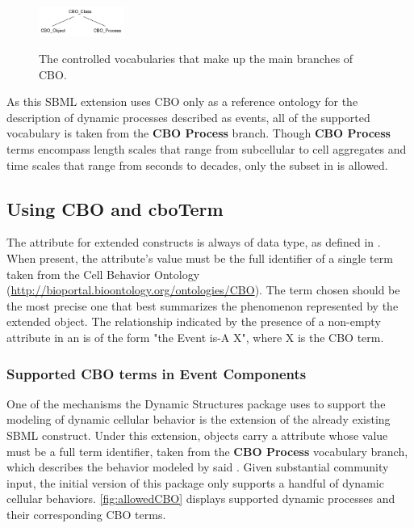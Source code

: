 \begin{figure}[tbhp]
	\centering
	\includegraphics[width=0.25\textwidth]{images/CBO_Hierarchy.pdf}\\
	\caption{The controlled vocabularies that make up the main branches of CBO.} \label{fig:CBOHierarchy}
\end{figure}

As this SBML extension uses CBO only as a reference ontology for the description of dynamic processes described as events, all of the supported vocabulary is taken from the \textbf{CBO \textunderscore Process} branch. Though \textbf{CBO \textunderscore Process} terms encompass length scales that range from subcellular to cell aggregates and time scales that range from seconds to decades, only the subset in  is allowed.

\subsection{Using CBO and cboTerm}
\label{subsec:CBOTerm&CBO}

The  attribute for extended \Event constructs is always of  data type, as defined in . When present, the attribute's value must be the full identifier of a single term taken from the Cell Behavior Ontology (\url{http://bioportal.bioontology.org/ontologies/CBO}). The term chosen should be the most precise one that best summarizes the phenomenon represented by the extended \Event object. The relationship indicated by the presence of a non-empty  attribute in an \Event is of the form "the Event is-A X", where X is the CBO term. 

\subsubsection{Supported CBO terms in Event Components}
\label{subsubsec:supportedCBO}

One of the mechanisms the Dynamic Structures package uses to support the modeling of dynamic cellular behavior is the extension of the already existing SBML \Event construct. Under this extension, \Event objects carry a  attribute whose value must be a full term identifier, taken from the \textbf{CBO \textunderscore Process} vocabulary branch, which describes the behavior modeled by said \Event. Given substantial community input, the initial version of this package only supports a handful of dynamic cellular behaviors. \ref{fig:allowedCBO} displays supported dynamic processes and their corresponding CBO terms.

